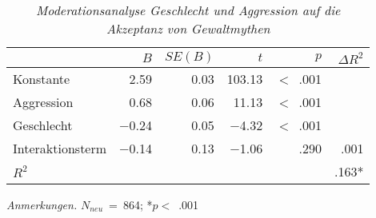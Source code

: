 \begin{table}[htb]
    \caption[Moderationsanalyse Geschlecht und Aggression auf die Akzeptanz von Gewaltmythen]{\textit {Moderationsanalyse Geschlecht und Aggression auf die Akzeptanz von Gewaltmythen}} 
    \label{Moderationsanalyse}
    \centering
    \begin{adjustbox}{width=11cm} %
    \small
    \begin{tabular}{lrrrrr}
      \hline
      & $B$    & $SE(B)$  & $t$    & $p$ & $\Delta R^{2}$\\
      \hline
    Konstante  & 2.59    & 0.03 & 103.13  & $<$~.001 & \\
    Aggression & 0.68    & 0.06 & 11.13   & $<$~.001 & \\
    Geschlecht & $-$0.24 & 0.05 & $-$4.32 & $<$~.001 & \\
    Interaktionsterm & $-$0.14 & 0.13 & $-$1.06 & .290 & .001 \\
    $R^{2}$          &         &      &         &      & .163* \\
       \hline
    \end{tabular}
    \end{adjustbox}
    
    \begin{tablenotes}
        \item \textit{Anmerkungen.} \( N_{neu} \)~=~864; *$p<$~.001
      \end{tablenotes}
    \end{table}



